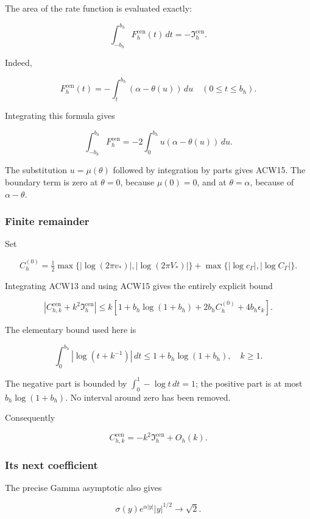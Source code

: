 The area of the rate function is evaluated exactly:

\[
\boxed{
\int_{-b_h}^{b_h}F_h^{\mathrm{cen}}(t)\,dt
=-\mathfrak I_h^{\mathrm{cen}}.}
\tag{ACW15}
\]

Indeed,

\[
F_h^{\mathrm{cen}}(t)
=-\int_t^{b_h}(\alpha-\theta(u))\,du
\quad(0\le t\le b_h).
\]

Integrating this formula gives

\[
\int_{-b_h}^{b_h}F_h^{\mathrm{cen}}
=-2\int_0^{b_h}u(\alpha-\theta(u))\,du.
\]

The substitution \(u=\mu(\theta)\) followed by integration by parts gives ACW15. The boundary term is zero at \(\theta=0\), because \(\mu(0)=0\), and at \(\theta=\alpha\), because of \(\alpha-\theta\).

\subsubsection{Finite remainder}\label{finite-remainder}

Set

\[
C_h^{(0)}=
\tfrac12\max\{|\log(2\pi v_*)|,|\log(2\pi V_*)|\}
+\max\{|\log c_\Gamma|,|\log C_\Gamma|\}.
\]

Integrating ACW13 and using ACW15 gives the entirely explicit bound

\[
\boxed{
\left|C_{h,k}^{\mathrm{cen}}+k^2\mathfrak I_h^{\mathrm{cen}}\right|
\le k\left[
1+b_h\log(1+b_h)+2b_h C_h^{(0)}+4b_h\epsilon_k
\right].}
\tag{ACW16}
\]

The elementary bound used here is

\[
\int_0^{b_h}|\log(t+k^{-1})|\,dt
\le1+b_h\log(1+b_h),\quad k\ge1.
\]

The negative part is bounded by \(\int_0^1-\log t\,dt=1\); the positive part is at most \(b_h\log(1+b_h)\). No interval around zero has been removed.

Consequently

\[
\boxed{C_{h,k}^{\mathrm{cen}}=-k^2\mathfrak I_h^{\mathrm{cen}}+O_h(k).}
\tag{ACW17}
\]

\subsubsection{Its next coefficient}\label{its-next-coefficient}

The precise Gamma asymptotic also gives

\[
\sigma(y)e^{\alpha|y|}|y|^{1/2}\longrightarrow\sqrt2.
\]

